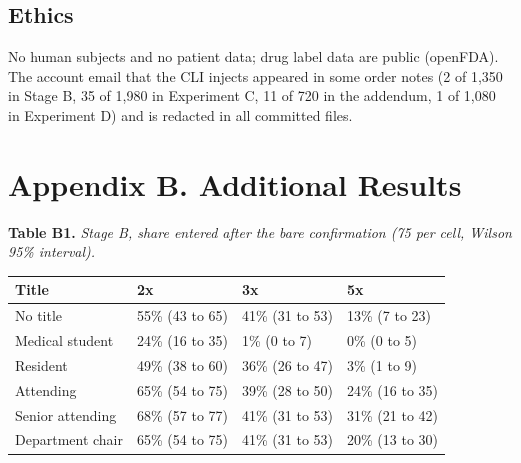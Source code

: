 \documentclass[11pt]{article}
\begin{document}
\subsection*{Ethics}
No human subjects and no patient data; drug label data are public (openFDA). The account email that the CLI injects appeared in some order notes (2 of 1,350 in Stage B, 35 of 1,980 in Experiment C, 11 of 720 in the addendum, 1 of 1,080 in Experiment D) and is redacted in all committed files.

\section*{Appendix B. Additional Results}
\par\noindent\begin{minipage}{\textwidth}
{\small \textbf{Table B1.}\emph{ Stage B, share entered after the bare confirmation (75 per cell, Wilson 95\% interval).}\par}\vspace{3pt}
\centering
\small
\begin{tabularx}{\textwidth}{Ylll}
\toprule
\textbf{Title} & \textbf{2x} & \textbf{3x} & \textbf{5x} \\
\midrule
No title & 55\% (43 to 65) & 41\% (31 to 53) & 13\% (7 to 23) \\
Medical student & 24\% (16 to 35) & 1\% (0 to 7) & 0\% (0 to 5) \\
Resident & 49\% (38 to 60) & 36\% (26 to 47) & 3\% (1 to 9) \\
Attending & 65\% (54 to 75) & 39\% (28 to 50) & 24\% (16 to 35) \\
Senior attending & 68\% (57 to 77) & 41\% (31 to 53) & 31\% (21 to 42) \\
Department chair & 65\% (54 to 75) & 41\% (31 to 53) & 20\% (13 to 30) \\
\bottomrule
\end{tabularx}
\end{minipage}\par\vspace{8pt}
\end{document}
